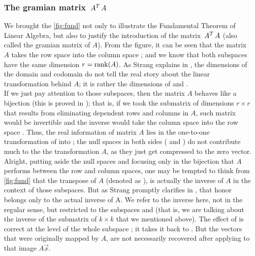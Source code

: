 \subsubsection{The gramian matrix $\,{A}^{T}\,A$}

We brought the \cref{fig:fund} not only to illustrate the
Fundamental Theorem of Linear Algebra, but also to justify the
introduction of the matrix $\,{A}^{T}\,A$ (also called the gramian
matrix of $A$). From the figure, it can be seen that the matrix $A$
takes the row space  into the column space ; and we
know that both subspaces have the same dimension $r =
\operatorname{rank}(A)$. As Strang explains in \cite{strang88}, the
dimensions of the domain  and codomain  do not tell the real
story about the linear transformation behind $A$; it is rather the
dimensions of  and . \\

If we just pay attention to
those subspaces, then the matrix $A$ behaves like a bijection (this is
proved in \cite{strang88}); that is, if we took the submatrix of
dimensions $r \times r$ that results from eliminating dependent rows
and columns in $A$, such matrix would be invertible and the inverse would
take the column space  into the row space . 
Thus, the real information of matrix $A$ lies in the one-to-one
transformation of  into ; the null spaces in both
sides ( and ) do not contribute much to the
the transformation $A$, as they just get compressed to the zero vector. \\

Alright, putting aside the null spaces and focusing only in the
bijection that $A$ performs between the row and column spaces, one may
be tempted to think from \cref{fig:fund} that the transpose of $A$
(denoted as ), is actually the inverse of $A$ in the context
of those subspaces. But as Strang promptly clarifies in
\cite{strang88}, that honor belongs only to the actual inverse of
A. We refer to the inverse here, not in the regular sense, but
restricted to the subspaces  and  (that is, we are
talking about the inverse of the submatrix of $k \times k$ that we
mentioned above). The effect of  is 
correct at the level of the whole subspace ; it takes it back to
. But the vectors that were originally mapped by $A$, are
not necessarily recovered after applying  to that image
$A\vec{x}$. \\

